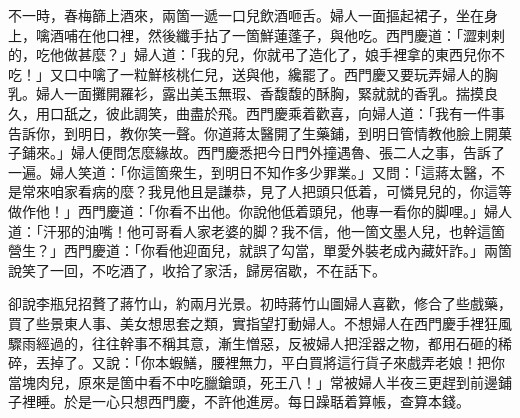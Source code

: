 不一時，春梅篩上酒來，兩箇一遞一口兒飲酒咂舌。婦人一面摳起裙子，坐在身上，噙酒哺在他口裡，然後纖手拈了一箇鮮蓮蓬子，{}與他吃。西門慶道：「澀剌剌的，{}吃他做甚麼？」婦人道：「我的兒，你就弔了造化了，娘手裡拿的東西兒你不吃！」又口中噙了一粒鮮核桃仁兒，{}送與他，纔罷了。西門慶又要玩弄婦人的胸乳。婦人一面攤開羅衫，露出美玉無瑕、香馥馥的酥胸，緊就就的香乳。揣摸良久，用口舐之，彼此調笑，曲盡於飛。西門慶乘着歡喜，向婦人道：「我有一件事告訴你，到明日，教你笑一聲。你道蔣太醫開了生藥鋪，到明日管情教他臉上開菓子鋪來。」婦人便問怎麼緣故。西門慶悉把今日門外撞遇魯、張二人之事，告訴了一遍。婦人笑道：「你這箇衆生，到明日不知作多少罪業。」又問：「這蔣太醫，不是常來咱家看病的麼？我見他且是謙恭，見了人把頭只低着，可憐見兒的，你這等做作他！」西門慶道：「你看不出他。你說他低着頭兒，他專一看你的脚哩。」婦人道：「汗邪的油嘴！他可哥看人家老婆的脚？我不信，他一箇文墨人兒，{}也幹這箇營生？」{}西門慶道：「你看他迎面兒，就誤了勾當，單愛外裝老成內藏奸詐。」兩箇說笑了一回，不吃酒了，收拾了家活，歸房宿歇，不在話下。

卻說李瓶兒招贅了蔣竹山，約兩月光景。初時蔣竹山圖婦人喜歡，修合了些戲藥，買了些景東人事、美女想思套之類，實指望打動婦人。不想婦人在西門慶手裡狂風驟雨經過的，往往幹事不稱其意，漸生憎惡，反被婦人把淫器之物，都用石砸的稀碎，丟掉了。{}又說：「你本蝦鱔，腰裡無力，{}平白買將這行貨子來戲弄老娘！把你當塊肉兒，原來是箇中看不中吃臘鎗頭，死王八！」常被婦人半夜三更趕到前邊鋪子裡睡。於是一心只想西門慶，不許他進房。每日躁聒着算帳，查算本錢。

